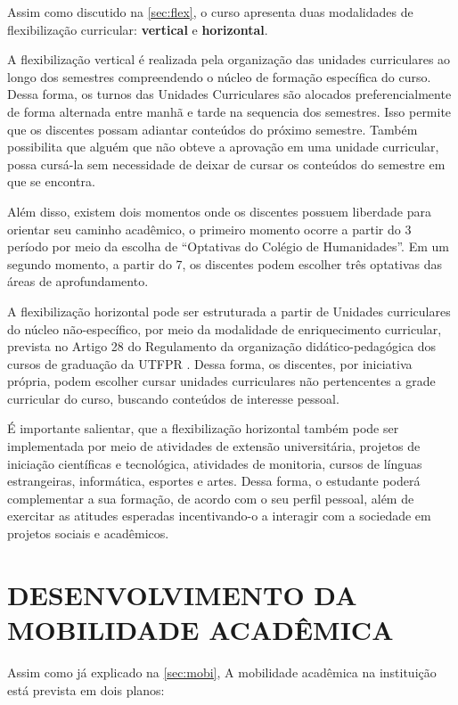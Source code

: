 Assim como discutido na \autoref{sec:flex}, o curso apresenta duas modalidades de flexibilização curricular: \textbf{vertical} e \textbf{horizontal}. 

A flexibilização vertical é realizada pela organização das unidades curriculares ao longo dos semestres compreendendo o núcleo de formação específica do curso. Dessa forma, os turnos das Unidades Curriculares são alocados preferencialmente de forma alternada entre manhã e tarde na sequencia dos semestres. Isso permite que os discentes possam adiantar conteúdos do próximo semestre. Também possibilita que alguém que não obteve a aprovação em uma unidade curricular, possa cursá-la sem necessidade de deixar de cursar os conteúdos do semestre em que se encontra.

Além disso, existem dois momentos onde os discentes possuem liberdade para orientar seu caminho acadêmico, o primeiro momento ocorre a partir do 3\textordmasculine{} período por meio da escolha de ``Optativas do Colégio de Humanidades''. Em um segundo momento, a partir do 7\textordmasculine{}, os discentes podem escolher três optativas das áreas de aprofundamento.

A flexibilização horizontal pode ser estruturada a partir de Unidades curriculares do núcleo não-específico, por meio da modalidade de enriquecimento curricular, prevista no Artigo 28 do Regulamento da organização didático-pedagógica dos cursos de graduação da UTFPR \cite{rodp}. Dessa forma, os discentes, por iniciativa própria, podem escolher cursar unidades curriculares não pertencentes a grade curricular do curso, buscando conteúdos de interesse pessoal.

É importante salientar, que a flexibilização horizontal também pode ser implementada por meio de atividades de extensão universitária, projetos de iniciação científicas e tecnológica, atividades de monitoria, cursos de línguas estrangeiras, informática, esportes e artes. Dessa forma, o estudante poderá complementar a sua formação, de acordo com o seu perfil pessoal, além de exercitar as atitudes esperadas incentivando-o a interagir com a sociedade em projetos sociais e acadêmicos.

\section{DESENVOLVIMENTO DA MOBILIDADE ACADÊMICA}

Assim como já explicado na \autoref{sec:mobi}, A mobilidade acadêmica na instituição está prevista em dois planos: 

